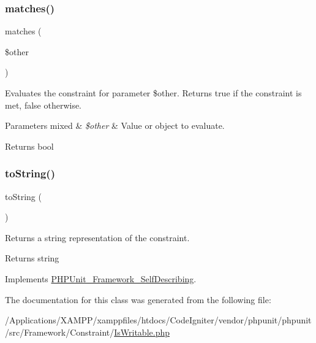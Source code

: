 \subsubsection{\texorpdfstring{matches()}{matches()}}
{\footnotesize\ttfamily matches (\begin{DoxyParamCaption}\item[{}]{\$other }\end{DoxyParamCaption})\hspace{0.3cm}{\ttfamily [protected]}}

Evaluates the constraint for parameter \$other. Returns true if the constraint is met, false otherwise.


\begin{DoxyParams}[1]{Parameters}
mixed & {\em \$other} & Value or object to evaluate.\\
\hline
\end{DoxyParams}
\begin{DoxyReturn}{Returns}
bool 
\end{DoxyReturn}
\mbox{\label{class_p_h_p_unit___framework___constraint___is_writable_a5558c5d549f41597377fa1ea8a1cefa3}} 
\subsubsection{\texorpdfstring{to\+String()}{toString()}}
{\footnotesize\ttfamily to\+String (\begin{DoxyParamCaption}{ }\end{DoxyParamCaption})}

Returns a string representation of the constraint.

\begin{DoxyReturn}{Returns}
string 
\end{DoxyReturn}


Implements \mbox{\hyperlink{interface_p_h_p_unit___framework___self_describing_a5558c5d549f41597377fa1ea8a1cefa3}{P\+H\+P\+Unit\+\_\+\+Framework\+\_\+\+Self\+Describing}}.



The documentation for this class was generated from the following file\+:\begin{DoxyCompactItemize}
\item 
/\+Applications/\+X\+A\+M\+P\+P/xamppfiles/htdocs/\+Code\+Igniter/vendor/phpunit/phpunit/src/\+Framework/\+Constraint/\mbox{\hyperlink{_is_writable_8php}{Is\+Writable.\+php}}\end{DoxyCompactItemize}
